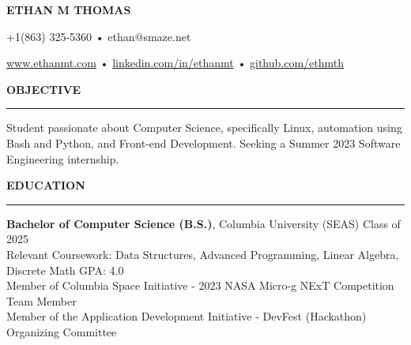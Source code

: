 \documentclass[11pt,letterpaper]{article}
\begin{document}
\begingroup
    \centerline{\MakeUppercase{\LARGE\bf Ethan M Thomas}}
    \medskip
\endgroup

\begingroup
\centerline{+1(863) 325-5360 • ethan@smaze.net}
\endgroup
\par

\begingroup
\centerline{\href{www.ethanmt.com}{www.ethanmt.com} • \href{https://www.linkedin.com/in/ethanmt/}{linkedin.com/in/ethanmt} • \href{https://github.com/ethmth}{github.com/ethmth}}
\endgroup
\par


\medskip
\MakeUppercase{{\bf Objective}} %
\medskip
\hrule %
\begin{list}{}{\setlength{\leftmargin}{0em}}
\item 
    {Student passionate about Computer Science, specifically Linux, automation using Bash and Python, and Front-end Development. Seeking a Summer 2023 Software Engineering internship.}
\end{list}


\medskip
\MakeUppercase{{\bf Education}} %
\medskip
\hrule %
\begin{list}{}{\setlength{\leftmargin}{0em}}
\item 
{\bf Bachelor of Computer Science (B.S.)}, Columbia University (SEAS) \hfill  {Class of 2025}\\
Relevant Coursework: Data Structures, Advanced Programming, Linear Algebra, Discrete Math \hfill {GPA: 4.0}
\\
Member of Columbia Space Initiative - 2023 NASA Micro-g NExT Competition Team Member \\ 
Member of the Application Development Initiative - DevFest (Hackathon) Organizing Committee
\end{list}
\end{document}

